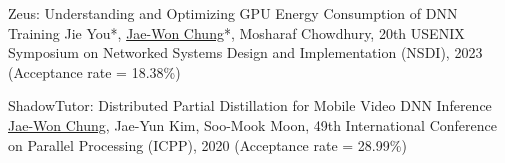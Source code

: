 



\begin{cvlist}

  \cvlistitem
    {Zeus: Understanding and Optimizing GPU Energy Consumption of DNN Training} %
    {Jie You*, \underline{Jae-Won Chung}*, Mosharaf Chowdhury, 20th USENIX Symposium on Networked Systems Design and Implementation (NSDI), 2023 (Acceptance rate = 18.38\%)} %

  \cvlistitem
    {ShadowTutor: Distributed Partial Distillation for Mobile Video DNN Inference} %
    {\underline{Jae-Won Chung}, Jae-Yun Kim, Soo-Mook Moon, 49th International Conference on Parallel Processing (ICPP), 2020 (Acceptance rate = 28.99\%)} %

\end{cvlist}
